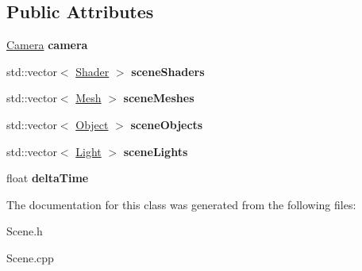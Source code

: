 \subsection*{Public Attributes}
\begin{DoxyCompactItemize}
\item 
\mbox{\label{class_scene_afed13ec4ba2d7ab75b273d507911b498}} 
\hyperlink{class_camera}{Camera} {\bfseries camera}
\item 
\mbox{\label{class_scene_a5f692c13f2db4299793ffc4d36c7e2ba}} 
std\+::vector$<$ \hyperlink{class_shader}{Shader} $>$ {\bfseries scene\+Shaders}
\item 
\mbox{\label{class_scene_a7be2dbccfae00f70b1d07b2c4d738ece}} 
std\+::vector$<$ \hyperlink{class_mesh}{Mesh} $>$ {\bfseries scene\+Meshes}
\item 
\mbox{\label{class_scene_ad9e4d19ec059a134617ee31d1df03714}} 
std\+::vector$<$ \hyperlink{class_object}{Object} $>$ {\bfseries scene\+Objects}
\item 
\mbox{\label{class_scene_adfe38881a26c650efb48cd53452dca7b}} 
std\+::vector$<$ \hyperlink{class_light}{Light} $>$ {\bfseries scene\+Lights}
\item 
\mbox{\label{class_scene_a4624158c6d315465401ccdda659bc13b}} 
float {\bfseries delta\+Time}
\end{DoxyCompactItemize}


The documentation for this class was generated from the following files\+:\begin{DoxyCompactItemize}
\item 
Scene.\+h\item 
Scene.\+cpp\end{DoxyCompactItemize}
